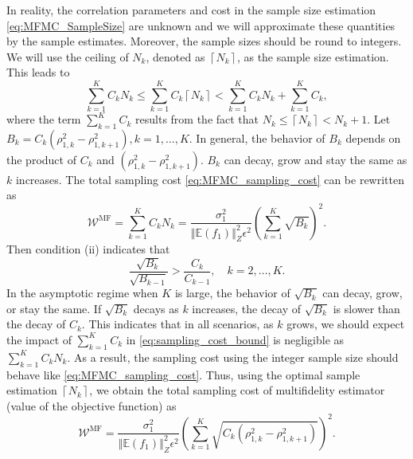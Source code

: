 \documentclass[final,3p,times,11pt]{elsarticle}
\begin{document}
In reality, the correlation parameters and cost in  the sample size estimation \eqref{eq:MFMC_SampleSize} are unknown and we will approximate these quantities by the sample estimates. Moreover, the sample sizes should be round to integers. We will use the ceiling of $N_k$, denoted as $\left\lceil N_k \right\rceil$, as the sample size estimation. This leads to
\begin{equation}\label{eq:sampling_cost_bound}
    \sum_{k=1}^K C_kN_k\le \sum_{k=1}^K C_k \left\lceil N_k\right\rceil<\sum_{k=1}^K C_kN_k + \sum_{k=1}^K C_k,
\end{equation}
where the term $\sum_{k=1}^K C_k$ results from the fact that $N_k\le \left\lceil N_k\right\rceil< N_k+1$. Let $B_k = C_k\left(\rho_{1,k}^2 - \rho_{1,k+1}^2\right), k=1,\dots, K$. In general, the behavior of $B_k$ depends on the product of $C_k$ and $\left(\rho_{1,k}^2 - \rho_{1,k+1}^2\right)$. $B_k$ can decay, grow and stay the same as $k$ increases. The total sampling cost \eqref{eq:MFMC_sampling_cost} can be rewritten as 
%
\begin{equation*}\label{eq:MFMC_sampling_cost_2}
    \mathcal{W}^{\text{MF}} = \sum_{k=1}^K C_k N_k = \frac{\sigma_1^2}{\left\Vert\mathbb{E}(f_1) \right\Vert_{Z}^2\epsilon^2}\left(\sum_{k=1}^K\sqrt{B_k} \right)^2.
\end{equation*}
%
Then condition (ii) indicates that
\begin{equation}
    \frac{\sqrt{B_{k}}}{\sqrt{B_{k-1}}}>\frac{C_{k}}{C_{k-1}}, \quad k=2,\ldots,K.
\end{equation}
In the asymptotic regime when $K$ is large, the behavior of $\sqrt{B_k}$ can decay, grow, or stay the same. If $\sqrt{B_k}$ decays as $k$ increases, the decay of $\sqrt{B_k}$ is slower than the decay of $C_k$. This indicates that in all scenarios, as $k$ grows, we should expect the impact of $\sum_{k=1}^K C_k$  in \eqref{eq:sampling_cost_bound} is negligible  as $\sum_{k=1}^K C_kN_k$. As a result, the sampling cost using the integer sample size should behave like \eqref{eq:MFMC_sampling_cost}. Thus, using the optimal sample estimation $\left\lceil N_k\right\rceil$, we obtain the total sampling cost of multifidelity estimator (value of the objective function) as
\begin{equation}\label{eq:MFMC_sampling_cost_efficiency}
    \mathcal{W}^\text{MF} = \frac{\sigma_1^2}{\left\Vert\mathbb{E}(f_1) \right\Vert_{Z}^2\epsilon^2}\left(\sum_{k=1}^K\sqrt{C_k\left(\rho_{1,k}^2 - \rho_{1,k+1}^2\right)}\right)^2.
\end{equation}
\end{document}
